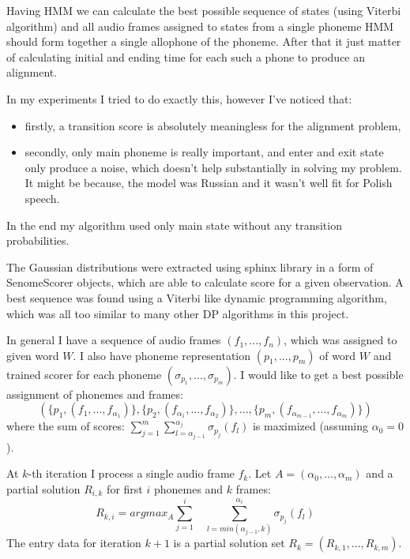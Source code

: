 \documentclass[12pt,a4paper,english]{article}
\begin{document}
Having HMM we can calculate the best possible sequence of states (using Viterbi algorithm) and all audio frames assigned to states from a single phoneme HMM should form together a single allophone of the phoneme. After that it just matter of calculating initial and ending time for each such a phone to produce an alignment. \newline

In my experiments I tried to do exactly this, however I've noticed that:
\begin{itemize}
    \item firstly, a transition score is absolutely meaningless for the alignment problem,
    \item secondly, only main phoneme is really important, and enter and exit state only produce a noise, which doesn't help substantially in solving my problem. It might be because, the model was Russian and it wasn't well fit for Polish speech.
\end{itemize}
In the end my algorithm used only main state without any transition probabilities. \newline

\newpage
The Gaussian distributions were extracted using sphinx library in a form of SenomeScorer objects, which are able to calculate score for a given observation. A best sequence was found using a Viterbi like dynamic programming algorithm, which was all too similar to many other DP algorithms in this project. \newline

In general I have a sequence of audio frames $(f_1, ..., f_n)$, which was assigned to given word $W$. \newline
I also have phoneme representation $(p_1, ..., p_m)$ of word $W$ and trained scorer for each phoneme $(\sigma_{p_1}, ..., \sigma_{p_m})$. \newline
I would like to get a best possible assignment of phonemes and frames:
\begin{equation}
    (\{p_1, (f_1,...,f_{\alpha_1})\}, \{p_2, (f_{\alpha_1},...,f_{\alpha_2})\}, ..., \{p_m, (f_{\alpha_{m-1}},...,f_{\alpha_m})\})
\end{equation}
where the sum of scores: $\sum_{j=1}^m \sum_{l=\alpha_{j-1}}^{\alpha_j} \sigma_{p_j}(f_l)$ is maximized (assuming $\alpha_0 = 0$). \newline

At $k$-th iteration I process a single audio frame $f_k$.\newline
Let $A = (\alpha_0, ..., \alpha_m)$ and a  partial solution $R_{i, k}$ for first $i$ phonemes and $k$ frames:
\begin{equation}
    R_{k, i} = argmax_A \sum_{j=1}^i \: \: \: \: \sum_{l=min(\alpha_{j-1}, k)}^{\alpha_i} \sigma_{p_j}(f_l)
\end{equation}
The entry data for iteration $k+1$ is a partial solution set $R_k = (R_{k, 1}, ..., R_{k, m})$. \newline
\end{document}
